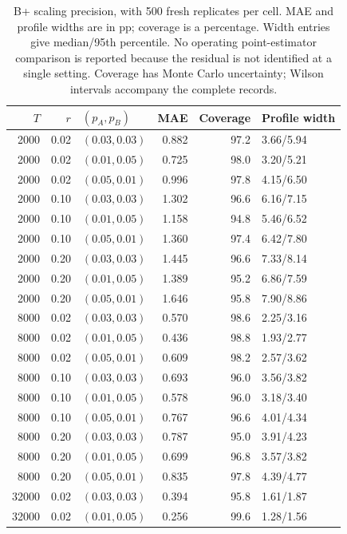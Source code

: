 \begin{table}[!htbp]
\centering
\small\setlength{\tabcolsep}{4pt}
\caption{B+ scaling precision, with 500 fresh replicates per cell. MAE and profile widths are in pp; coverage is a percentage. Width entries give median/95th percentile. No operating point-estimator comparison is reported because the residual is not identified at a single setting. Coverage has Monte Carlo uncertainty; Wilson intervals accompany the complete records.}
\label{tab:precisionbplus}
\begin{tabular}{@{}rrlrrl@{}}
\toprule
$T$ & $r$ & $(p_A,p_B)$ & MAE & Coverage & Profile width \\
\midrule
2000 & 0.02 & $(0.03,0.03)$ & 0.882 & 97.2 & 3.66/5.94 \\
2000 & 0.02 & $(0.01,0.05)$ & 0.725 & 98.0 & 3.20/5.21 \\
2000 & 0.02 & $(0.05,0.01)$ & 0.996 & 97.8 & 4.15/6.50 \\
2000 & 0.10 & $(0.03,0.03)$ & 1.302 & 96.6 & 6.16/7.15 \\
2000 & 0.10 & $(0.01,0.05)$ & 1.158 & 94.8 & 5.46/6.52 \\
2000 & 0.10 & $(0.05,0.01)$ & 1.360 & 97.4 & 6.42/7.80 \\
2000 & 0.20 & $(0.03,0.03)$ & 1.445 & 96.6 & 7.33/8.14 \\
2000 & 0.20 & $(0.01,0.05)$ & 1.389 & 95.2 & 6.86/7.59 \\
2000 & 0.20 & $(0.05,0.01)$ & 1.646 & 95.8 & 7.90/8.86 \\
8000 & 0.02 & $(0.03,0.03)$ & 0.570 & 98.6 & 2.25/3.16 \\
8000 & 0.02 & $(0.01,0.05)$ & 0.436 & 98.8 & 1.93/2.77 \\
8000 & 0.02 & $(0.05,0.01)$ & 0.609 & 98.2 & 2.57/3.62 \\
8000 & 0.10 & $(0.03,0.03)$ & 0.693 & 96.0 & 3.56/3.82 \\
8000 & 0.10 & $(0.01,0.05)$ & 0.578 & 96.0 & 3.18/3.40 \\
8000 & 0.10 & $(0.05,0.01)$ & 0.767 & 96.6 & 4.01/4.34 \\
8000 & 0.20 & $(0.03,0.03)$ & 0.787 & 95.0 & 3.91/4.23 \\
8000 & 0.20 & $(0.01,0.05)$ & 0.699 & 96.8 & 3.57/3.82 \\
8000 & 0.20 & $(0.05,0.01)$ & 0.835 & 97.8 & 4.39/4.77 \\
32000 & 0.02 & $(0.03,0.03)$ & 0.394 & 95.8 & 1.61/1.87 \\
32000 & 0.02 & $(0.01,0.05)$ & 0.256 & 99.6 & 1.28/1.56 \\

\end{tabular}
\end{table}
